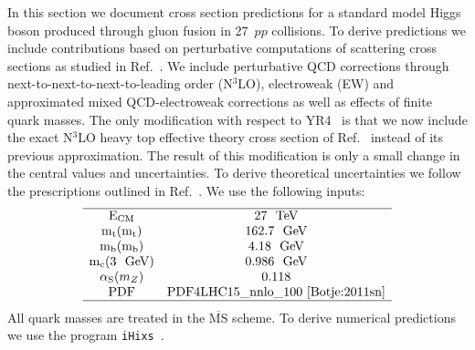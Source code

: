 \label{sec:he-lhc-ggF}
In this section we document cross section predictions for a standard
model Higgs boson produced through gluon fusion in 27~\UTeV $pp$ collisions.  To
derive predictions we include contributions based on perturbative
computations of scattering cross sections as studied in
Ref.~\cite{Anastasiou:2016cez}.  We include perturbative QCD
corrections through next-to-next-to-next-to-leading order (N$^3$LO), electroweak (EW) and approximated mixed
QCD-electroweak corrections as well as effects of finite quark
masses. The only modification with respect to YR4~\cite{deFlorian:2016spz} is that we
now include the exact N$^3$LO heavy top effective theory cross section of
Ref.~\cite{Mistlberger:2018etf} instead of its previous approximation. The
result of this modification is only a small change in the central values and
uncertainties. To derive theoretical uncertainties we follow the
prescriptions outlined in Ref.~\cite{Anastasiou:2016cez}.
We use the following inputs:
\begin{equation}
\begin{array}{c  c}
\hline
\text{E}_\text{CM} & 27~\text{\ensuremath{~\text{TeV}}} \\
\text{m}_\text{t}(\text{m}_\text{t}) & 162.7~\text{\ensuremath{~\text{GeV}}} \\
\text{m}_\text{b}(\text{m}_\text{b}) & 4.18~\text{\ensuremath{~\text{GeV}}} \\
\text{m}_\text{c}(3 \text{ \ensuremath{~\text{GeV}}}) & 0.986~\text{\ensuremath{~\text{GeV}}} \\
\alpha_\text{S} (m_Z) & 0.118  \\
\text{PDF} & \text{PDF4LHC15\_nnlo\_100}\text{~\cite{Botje:2011sn}}\\
\hline
\end{array}
\end{equation}
All quark masses are treated in the $\overline{\text{MS}}$ scheme. To derive numerical predictions we use the program \texttt{iHixs}~\cite{Dulat:2018rbf}.

